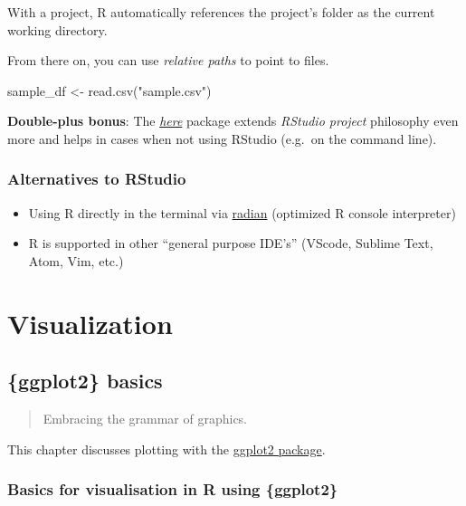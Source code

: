 \documentclass[]{book}
\newenvironment{Shaded}{}{}
\newcommand{\KeywordTok}[1]{\textcolor[rgb]{0.00,0.00,1.00}{#1}}
\newcommand{\NormalTok}[1]{#1}
\newcommand{\StringTok}[1]{\textcolor[rgb]{0.00,0.50,0.50}{#1}}
\begin{document}
With a project, R automatically references the project's folder as the current working directory.

From there on, you can use \emph{relative paths} to point to files.

\begin{Shaded}
\begin{Highlighting}[]
\NormalTok{sample_df <-}\StringTok{ }\KeywordTok{read.csv}\NormalTok{(}\StringTok{"sample.csv"}\NormalTok{)}
\end{Highlighting}
\end{Shaded}

\textbf{Double-plus bonus}: The \href{https://github.com/r-lib/here}{\emph{here}} package extends \emph{RStudio project} philosophy even more and helps in cases when not using RStudio (e.g.~on the command line).

\hypertarget{alternatives-to-rstudio}{%
\section{Alternatives to RStudio}\label{alternatives-to-rstudio}}

\begin{itemize}
\item
  Using R directly in the terminal via \href{https://github.com/randy3k/radian}{radian} (optimized R console interpreter)
\item
  R is supported in other ``general purpose IDE's'' (VScode, Sublime Text, Atom, Vim, etc.)
\end{itemize}

\hypertarget{part-visualization}{%
\part{Visualization}\label{part-visualization}}

\hypertarget{vis-basics}{%
\chapter{\{ggplot2\} basics}\label{vis-basics}}

\begin{quote}
Embracing the grammar of graphics.
\end{quote}

This chapter discusses plotting with the \href{https://ggplot2.tidyverse.org/}{ggplot2 package}.

\hypertarget{basics-for-visualisation-in-r-using-ggplot2}{%
\section{Basics for visualisation in R using \{ggplot2\}}\label{basics-for-visualisation-in-r-using-ggplot2}}
\end{document}
